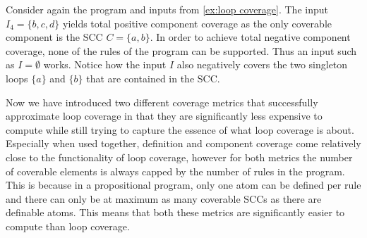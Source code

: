 \begin{example}
\label{ex:component coverage}
    Consider again the program and inputs from \cref{ex:loop coverage}. The input \(I_4 = \{b, c, d\}\) yields total positive component coverage as the only coverable component is the SCC \(C = \{a, b\}\). In order to achieve total negative component coverage, none of the rules of the program can be supported. Thus an input such as \(I = \emptyset\) works. Notice how the input $I$ also negatively covers the two singleton loops \(\{a\}\) and \(\{b\}\) that are contained in the SCC.
\end{example}

Now we have introduced two different coverage metrics that successfully approximate loop coverage in that they are significantly less expensive to compute while still trying to capture the essence of what loop coverage is about. Especially when used together, definition and component coverage come relatively close to the functionality of loop coverage, however for both metrics the number of coverable elements is always capped by the number of rules in the program. This is because in a propositional program, only one atom can be defined per rule and there can only be at maximum as many coverable SCCs as there are definable atoms. This means that both these metrics are significantly easier to compute than loop coverage.


\begin{comment}
    - strongly connected components are the maximal loops of the program, therefore this is an approximation of loop coverage       \/  
    
    - Definition + example      \/
    
    - Definition of negative coverage is different from loop coverage! \/
    
    - because of this different definition positive/negative component coverage of a specific component implies positive/negative loop 
    coverage for all subset loops of the component (would not be the case for negative coverage if definition is different)     \/
    
    (- total positive loop coverage implies total positive component coverage, however this is not true for negative coverage because 
    of the different definition (see above)     \/
    
    - total program coverage implies total component coverage)  \/

    (- with the help of definition coverage one could redefine loop and component coverage based on definition coverage)

    - both definition coverage and component coverage are capped on the number of rules in the program      \/
\end{comment}

